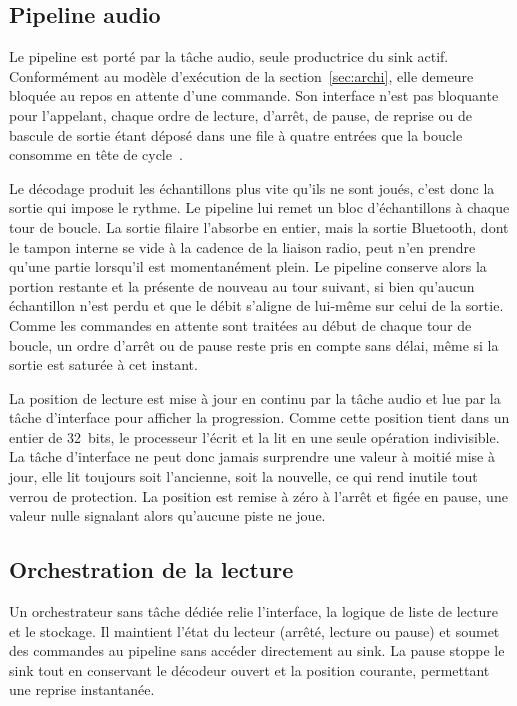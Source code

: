 \subsection{Pipeline audio}

Le pipeline est porté par la tâche audio, seule productrice du sink actif. Conformément au modèle d'exécution de la section~\ref{sec:archi}, elle demeure bloquée au repos en attente d'une commande. Son interface n'est pas bloquante pour l'appelant, chaque ordre de lecture, d'arrêt, de pause, de reprise ou de bascule de sortie étant déposé dans une file à quatre entrées que la boucle consomme en tête de cycle~\cite{freertos_kernel_doc}.

Le décodage produit les échantillons plus vite qu'ils ne sont joués, c'est donc la sortie qui impose le rythme. Le pipeline lui remet un bloc d'échantillons à chaque tour de boucle. La sortie filaire l'absorbe en entier, mais la sortie Bluetooth, dont le tampon interne se vide à la cadence de la liaison radio, peut n'en prendre qu'une partie lorsqu'il est momentanément plein. Le pipeline conserve alors la portion restante et la présente de nouveau au tour suivant, si bien qu'aucun échantillon n'est perdu et que le débit s'aligne de lui-même sur celui de la sortie. Comme les commandes en attente sont traitées au début de chaque tour de boucle, un ordre d'arrêt ou de pause reste pris en compte sans délai, même si la sortie est saturée à cet instant.

La position de lecture est mise à jour en continu par la tâche audio et lue par la tâche d'interface pour afficher la progression. Comme cette position tient dans un entier de 32~bits, le processeur l'écrit et la lit en une seule opération indivisible. La tâche d'interface ne peut donc jamais surprendre une valeur à moitié mise à jour, elle lit toujours soit l'ancienne, soit la nouvelle, ce qui rend inutile tout verrou de protection. La position est remise à zéro à l'arrêt et figée en pause, une valeur nulle signalant alors qu'aucune piste ne joue.

\subsection{Orchestration de la lecture}

Un orchestrateur sans tâche dédiée relie l'interface, la logique de liste de lecture et le stockage. Il maintient l'état du lecteur (arrêté, lecture ou pause) et soumet des commandes au pipeline sans accéder directement au \gls{sink}. La pause stoppe le \gls{sink} tout en conservant le décodeur ouvert et la position courante, permettant une reprise instantanée.

